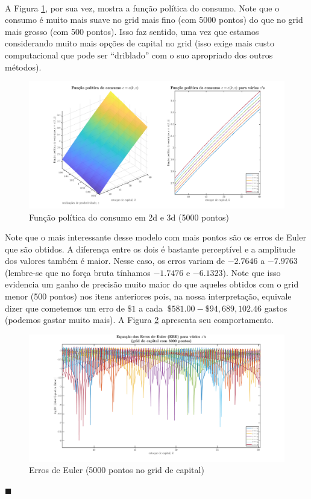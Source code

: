\documentclass[10pt]{article}
\newcommand*{\QEDA}{\hfill\ensuremath{\blacksquare}}%
\newcommand\0{\mathbf{0}}
\newenvironment{sol}
    {\\[1em] {\color{magenta}\text{Resposta.}}
    }
    {{\color{blue!50!black}\QEDA}}
\begin{document}
\begin{enumerate}[wide]
\begin{sol}
\newpage

A Figura \ref{fig8}, por sua vez, mostra a função política do consumo. Note que o consumo é muito mais suave no grid mais fino (com 5000 pontos) do que no grid mais grosso (com 500 pontos). Isso faz sentido, uma vez que estamos considerando muito mais opções de capital no grid (isso exige mais custo computacional que pode ser ``driblado'' com o suo apropriado dos outros métodos).

\begin{figure}[htp!]
\centering
\includegraphics[scale=0.3]{consumption_policy_function_brute_force_5000.png}
\caption{Função política do consumo em 2d e 3d (5000 pontos)}
\label{fig8}
\end{figure}


Note que o mais interessante desse modelo com mais pontos são os erros de Euler que são obtidos. A diferença entre os dois é bastante perceptível e a amplitude dos valores também é maior. Nesse caso, os erros variam de $-2.7646$ a $-7.9763$ (lembre-se que no força bruta tínhamos $-1.7476$ e $-6.1323$). Note que isso evidencia um ganho de precisão muito maior do que aqueles obtidos com o grid menor (500 pontos) nos itens anteriores pois, na nossa interpretação, equivale dizer que cometemos um erro de $\$1$ a cada $~\$581.00 - \$94,689,102.46$ gastos (podemos gastar muito mais). A Figura \ref{fig9} apresenta seu comportamento.

\begin{figure}[htp!]
\centering
\includegraphics[scale=0.3]{eee_5000.png}
\caption{Erros de Euler (5000 pontos no grid de capital)}
\label{fig9}
\end{figure}



\end{sol}
\end{enumerate}
\end{document}
